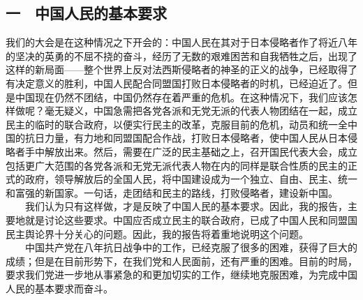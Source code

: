 \documentclass[cn,11pt,chinese]{elegantbook}
\def\myformat#1{\hfil\hfil #1}
\begin{document}
\subsection*{\myformat{一　中国人民的基本要求}}
我们的大会是在这种情况之下开会的：中国人民在其对于日本侵略者作了将近八年的坚决的英勇的不屈不挠的奋斗，经历了无数的艰难困苦和自我牺牲之后，出现了这样的新局面——整个世界上反对法西斯侵略者的神圣的正义的战争，已经取得了有决定意义的胜利，中国人民配合同盟国打败日本侵略者的时机，已经迫近了。但是中国现在仍然不团结，中国仍然存在着严重的危机。在这种情况下，我们应该怎样做呢？毫无疑义，中国急需把各党各派和无党无派的代表人物团结在一起，成立民主的临时的联合政府，以便实行民主的改革，克服目前的危机，动员和统一全中国的抗日力量，有力地和同盟国配合作战，打败日本侵略者，使中国人民从日本侵略者手中解放出来。然后，需要在广泛的民主基础之上，召开国民代表大会，成立包括更广大范围的各党各派和无党无派代表人物在内的同样是联合性质的民主的正式的政府，领导解放后的全国人民，将中国建设成为一个独立、自由、民主、统一和富强的新国家。一句话，走团结和民主的路线，打败侵略者，建设新中国。\\
　　我们认为只有这样做，才是反映了中国人民的基本要求。因此，我的报告，主要地就是讨论这些要求。中国应否成立民主的联合政府，已成了中国人民和同盟国民主舆论界十分关心的问题。因此，我的报告将着重地说明这个问题。\\
　　中国共产党在八年抗日战争中的工作，已经克服了很多的困难，获得了巨大的成绩；但是在目前形势下，在我们党和人民面前，还有严重的困难。目前的时局，要求我们党进一步地从事紧急的和更加切实的工作，继续地克服困难，为完成中国人民的基本要求而奋斗。\\
\end{document}
